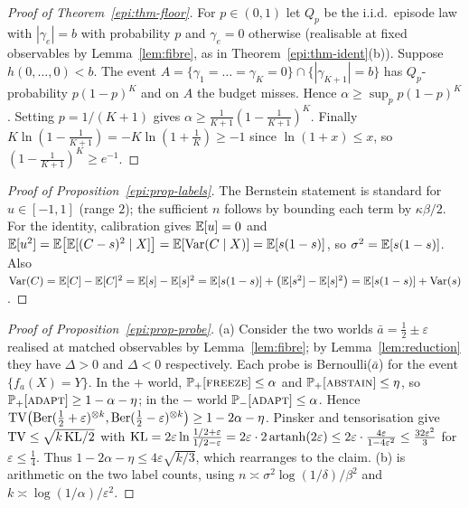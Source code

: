 \begin{proof}[Proof of Theorem~\ref{epi:thm-floor}]
For $p\in(0,1)$ let $Q_p$ be the i.i.d.\ episode law with $|\gamma_e|=b$ with probability $p$ and
$\gamma_e=0$ otherwise (realisable at fixed observables by Lemma~\ref{lem:fibre}, as in
Theorem~\ref{epi:thm-ident}(b)). Suppose $h(0,\dots,0)<b$. The event
$A=\{\gamma_1=\dots=\gamma_K=0\}\cap\{|\gamma_{K+1}|=b\}$ has $Q_p$-probability $p(1-p)^K$ and on $A$
the budget misses. Hence $\alpha\ge\sup_{p}p(1-p)^K$. Setting $p=1/(K+1)$ gives
$\alpha\ge\frac1{K+1}(1-\frac1{K+1})^K$. Finally
$K\ln(1-\tfrac1{K+1})=-K\ln(1+\tfrac1K)\ge-1$ since $\ln(1+x)\le x$, so
$(1-\tfrac1{K+1})^K\ge e^{-1}$.
\end{proof}

\begin{proof}[Proof of Proposition~\ref{epi:prop-labels}]
The Bernstein statement is standard for $u\in[-1,1]$ (range $2$); the sufficient $n$ follows by
bounding each term by $\kappa\beta/2$. For the identity, calibration gives $\E[u]=0$ and
$\E[u^2]=\E\bigl[\E[(C-s)^2\mid X]\bigr]=\E[\Var(C\mid X)]=\E[s(1-s)]$, so $\sigma^2=\E[s(1-s)]$.
Also $\Var(C)=\E[C]-\E[C]^2=\E[s]-\E[s]^2=\E[s(1-s)]+\bigl(\E[s^2]-\E[s]^2\bigr)
=\E[s(1-s)]+\Var(s)$.
\end{proof}

\begin{proof}[Proof of Proposition~\ref{epi:prop-probe}]
(a) Consider the two worlds $\bar a=\tfrac12\pm\varepsilon$ realised at matched observables by
Lemma~\ref{lem:fibre}; by Lemma~\ref{lem:reduction} they have
$\Delta>0$ and $\Delta<0$ respectively. Each probe is Bernoulli($\bar a$) for the event
$\{f_a(X)=Y\}$. In the $+$ world, $\Pr_+[\textsc{freeze}]\le\alpha$ and
$\Pr_+[\textsc{abstain}]\le\eta$, so $\Pr_+[\textsc{adapt}]\ge1-\alpha-\eta$; in the $-$ world
$\Pr_-[\textsc{adapt}]\le\alpha$. Hence
$\TV\bigl(\mathrm{Ber}(\tfrac12+\varepsilon)^{\otimes k},
\mathrm{Ber}(\tfrac12-\varepsilon)^{\otimes k}\bigr)\ge1-2\alpha-\eta$. Pinsker and tensorisation
give $\TV\le\sqrt{k\,\KL/2}$ with
$\KL=2\varepsilon\ln\frac{1/2+\varepsilon}{1/2-\varepsilon}
=2\varepsilon\cdot2\operatorname{artanh}(2\varepsilon)\le
2\varepsilon\cdot\frac{4\varepsilon}{1-4\varepsilon^2}\le\frac{32\varepsilon^2}{3}$
for $\varepsilon\le\tfrac14$. Thus $1-2\alpha-\eta\le4\varepsilon\sqrt{k/3}$, which rearranges to the
claim. (b) is arithmetic on the two label counts, using
$n\asymp\sigma^2\log(1/\delta)/\beta^2$ and $k\asymp\log(1/\alpha)/\varepsilon^2$.
\end{proof}

